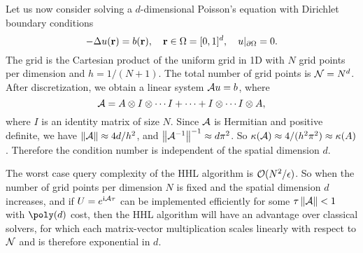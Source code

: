 Let us now consider solving a $d$-dimensional Poisson's equation with Dirichlet boundary conditions
\begin{equation}
-\Delta u(\mathbf{r})=b(\mathbf{r}), \quad \mathbf{r}\in \Omega=[0,1]^d, \quad u|_{\partial \Omega}=0.
\end{equation}
The grid is the Cartesian product of the uniform grid in 1D with $N$ grid points per dimension and $h=1/(N+1)$.
The total number of grid points is $\mathcal{N}=N^d$.
After discretization, we obtain a linear system $\mathcal{A}u=b$, where
\begin{equation}
\mathcal{A}=A\otimes I\otimes\cdots I+\cdots+I\otimes\cdots I\otimes A,
\label{eqn:A_ddimension}
\end{equation}
where $I$ is an identity matrix of size $N$.
Since $\mathcal{A}$ is Hermitian and positive definite, we have $\left\lVert\mathcal{A}\right\rVert\approx 4d/h^2$, and $\left\lVert\mathcal{A}^{-1}\right\rVert^{-1}\approx d\pi^2$.
So $\kappa(\mathcal{A})\approx 4/(h^2\pi^2)\approx \kappa(A)$.
Therefore the condition number is independent of the spatial dimension $d$.

The worst case query complexity of the HHL algorithm is $\mathcal{O}(N^2/\epsilon)$.
So when the number of grid points per dimension $N$ is fixed and the spatial dimension $d$ increases, and if $U=e^{\mathrm{i} \mathcal{A}\tau}$ can be implemented efficiently for some $\tau\left\lVert\mathcal{A}\right\rVert<1$ with $\poly(d)$ cost, then the HHL algorithm will have an advantage over classical solvers, for which each matrix-vector multiplication scales linearly with respect to $\mathcal{N}$ and is therefore exponential in $d$.

